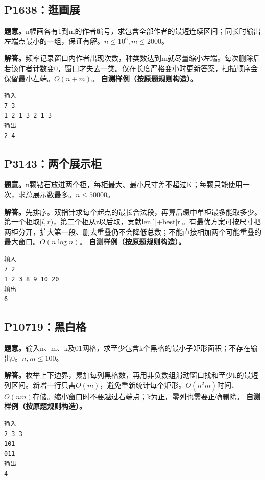 \subsection{P1638：逛画展}


\noindent\textbf{题意。}n幅画各有1到m的作者编号，求包含全部作者的最短连续区间；同长时输出左端点最小的一组，保证有解。$n\le10^6,m\le2000$。

\noindent\textbf{解答。}频率记录窗口内作者出现次数，种类数达到m就尽量缩小左端。每次删除后若该作者计数变0，窗口才失去一类。仅在长度严格变小时更新答案，扫描顺序会保留最小左端。$O(n+m)$。
\textbf{自测样例（按原题规则构造）。}
\begin{verbatim}
输入
7 3
1 2 1 3 2 1 3
输出
2 4
\end{verbatim}

\subsection{P3143：两个展示柜}


\noindent\textbf{题意。}n颗钻石放进两个柜，每柜最大、最小尺寸差不超过K；每颗只能使用一次，求总展示数最多。$n\le50000$。

\noindent\textbf{解答。}先排序。双指针求每个起点的最长合法段，再算后缀中单柜最多能取多少。第一个柜取$[l,r)$，第二个柜从r以后取，贡献len[l]+best[r]。有最优方案可按尺寸把两柜分开，扩大第一段、删去重叠仍不会降低总数；不能直接相加两个可能重叠的最大窗口。$O(n\log n)$。
\textbf{自测样例（按原题规则构造）。}
\begin{verbatim}
输入
7 2
1 2 3 8 9 10 20
输出
6
\end{verbatim}

\subsection{P10719：黑白格}


\noindent\textbf{题意。}输入n、m、k及01网格，求至少包含k个黑格的最小子矩形面积；不存在输出0。$n,m\le100$。

\noindent\textbf{解答。}枚举上下边界，累加每列黑格数，再用非负数组滑动窗口找和至少k的最短列区间。新增一行只需$O(m)$，避免重新统计每个矩形。$O(n^2m)$时间、$O(nm)$存储。缩小窗口时不要越过右端点；k为正，零列也需要正确删除。
\textbf{自测样例（按原题规则构造）。}
\begin{verbatim}
输入
2 3 3
101
011
输出
4
\end{verbatim}

